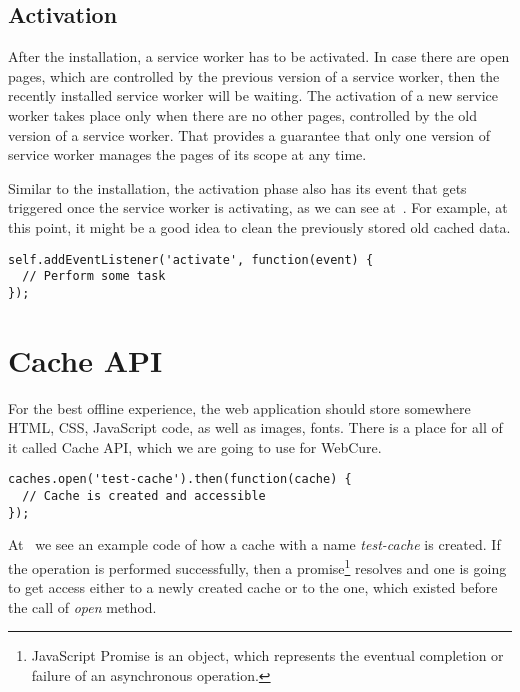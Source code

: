 \subsection*{Activation}

After the installation, a service worker has to be activated. In case there are open pages, which are controlled by the previous version of a service worker, then the recently installed service worker will be waiting. The activation of a new service worker takes place only when there are no other pages, controlled by the old version of a service worker. That provides a guarantee that only one version of service worker manages the pages of its scope at any time.

Similar to the installation, the activation phase also has its event that gets triggered once the service worker is activating, as we can see at~. For example, at this point, it might be a good idea to clean the previously stored old cached data.

\begin{lstlisting}[caption={An example code, which demonstates a listener for the \textit{activation} service worker's event\cite{32}.}, label={lst:tech4}]
self.addEventListener('activate', function(event) {
  // Perform some task
});
\end{lstlisting}

\section{Cache API}

For the best offline experience, the web application should store somewhere HTML, CSS, JavaScript code, as well as images, fonts. There is a place for all of it called Cache API, which we are going to use for WebCure. 

\begin{lstlisting}[caption={An example code, which demonstrates how one can create cache storage called \textit{test-cache}\cite{34}.}, label={lst:tech6}]
caches.open('test-cache').then(function(cache) {
  // Cache is created and accessible
});
\end{lstlisting}

At~ we see an example code of how a cache with a name \textit{test-cache} is created. If the operation is performed successfully, then a promise\footnote{JavaScript Promise is an object, which represents the eventual completion or failure of an asynchronous operation\cite{37}.} resolves and one is going to get access either to a newly created cache or to the one, which existed before the call of \textit{open} method.

